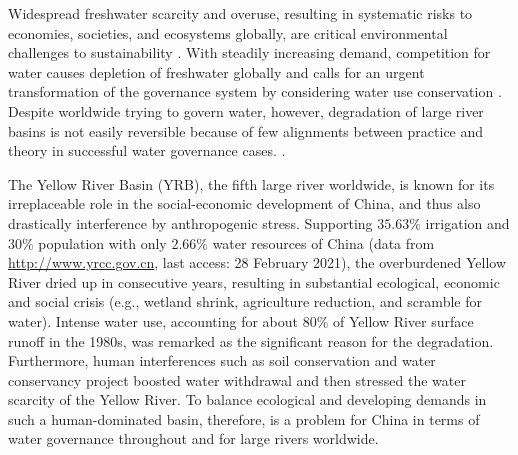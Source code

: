 Widespread freshwater scarcity and overuse, resulting in systematic risks to economies, societies, and ecosystems globally, are critical environmental challenges to sustainability \cite{distefano2017, dolan2021, xu2020b, mekonnen2016}.
With steadily increasing demand, competition for water causes depletion of freshwater globally and calls for an urgent transformation of the governance system by considering water use conservation \cite{gleick2010, ziolkowska2016, wang2019d}.
Despite worldwide trying to govern water, however, degradation of large river basins is not easily reversible because of few alignments between practice and theory in successful water governance cases.
\cite{giuliani2013, falkenmark2019, jaeger2019}.

The Yellow River Basin (YRB), the fifth large river worldwide, is known for its irreplaceable role in the social-economic development of China, and thus also drastically interference by anthropogenic stress.
Supporting $35.63\%$ irrigation and $30\%$ population with only $2.66\%$ water resources of China (data from \href{http://www.yrcc.gov.cn}{http://www.yrcc.gov.cn}, last access: 28 February 2021), the overburdened Yellow River dried up in consecutive years, resulting in substantial ecological, economic and social crisis (e.g., wetland shrink, agriculture reduction, and scramble for water).
Intense water use, accounting for about $80\%$ of Yellow River surface runoff in the 1980s, was remarked as the significant reason for the degradation.
Furthermore, human interferences such as soil conservation and water conservancy project boosted water withdrawal and then stressed the water scarcity of the Yellow River.
To balance ecological and developing demands in such a human-dominated basin, therefore, is a problem for China in terms of water governance throughout and for large rivers worldwide.

